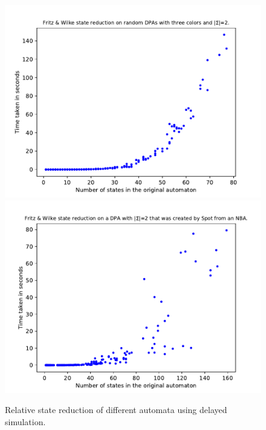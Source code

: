 \begin{figure}
\begin{minipage}{0.49\textwidth}
		\caption{Relative state reduction of different automata using delayed simulation.}
		\label{exp:fig:fritzwilke_reduct_sccs}
	\end{minipage}
	\hfill
	\begin{minipage}{0.49\textwidth}
		\includegraphics[page=5,height=.3\textheight]{../data/analysis/fritzwilke/gendet_ap1.pdf} 
		\includegraphics[page=5,height=.3\textheight]{../data/analysis/fritzwilke/detspot_ap1.pdf} 

\end{minipage}
\end{figure}

